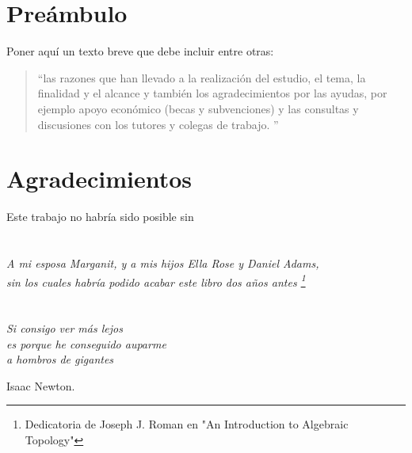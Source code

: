 
\chapter*{Preámbulo}
\thispagestyle{empty}
Poner aquí un texto breve que debe incluir entre otras:
\begin{quote}
``las razones que han llevado a la realización del estudio, el tema, la finalidad y el alcance y también los agradecimientos por las ayudas, por ejemplo apoyo económico (becas y subvenciones) y las consultas y discusiones con los tutores y colegas de trabajo. \citep{UNE50136:97}''
\end{quote}


\cleardoublepage %
\chapter*{Agradecimientos}

\thispagestyle{empty}
\vspace{1cm}

Este trabajo no habría sido posible sin 

\cleardoublepage %
\chapter*{}
\setlength{\leftmargin}{0.5\textwidth}
\setlength{\parsep}{0cm}
\addtolength{\topsep}{0.5cm}
\begin{flushright}
\small\em{
A mi esposa Marganit, y a mis hijos Ella Rose y Daniel Adams,\\
sin los cuales habría podido acabar este libro dos años antes \footnote{Dedicatoria de Joseph J. Roman en "An Introduction to Algebraic Topology"}
}
\end{flushright}


\cleardoublepage %
\chapter*{}
\setlength{\leftmargin}{0.5\textwidth}
\setlength{\parsep}{0cm}
\addtolength{\topsep}{0.5cm}
\begin{flushright}
\small\em{
Si consigo ver más lejos\\
es porque he conseguido auparme\\ 
a hombros de gigantes
}
\end{flushright}
\begin{flushright}
\small{
Isaac Newton.
}
\end{flushright}
\cleardoublepage %
